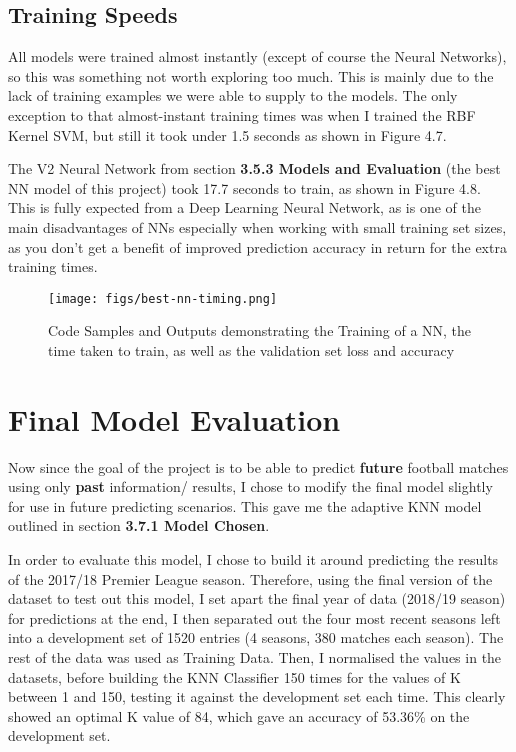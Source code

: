 \documentclass[12pt,a4paper,twoside,openright]{report}
\begin{document}
\subsection{Training Speeds}

All models were trained almost instantly (except of course the Neural Networks), so this was something not worth exploring too much. This is mainly due to the lack of training examples we were able to supply to the models. The only exception to that almost-instant training times was when I trained the RBF Kernel SVM, but still it took under 1.5 seconds as shown in Figure 4.7.

The V2 Neural Network from section \textbf{3.5.3 Models and Evaluation} (the best NN model of this project) took 17.7 seconds to train, as shown in Figure 4.8. This is fully expected from a Deep Learning Neural Network, as is one of the main disadvantages of NNs especially when working with small training set sizes, as you don't get a benefit of improved prediction accuracy in return for the extra training times.

\begin{figure}[h]
  \centering
  \texttt{[image: figs/best-nn-timing.png]}
  \caption{Code Samples and Outputs demonstrating the Training of a NN, the time taken to train, as well as the validation set loss and accuracy}
  \label{fig:best-nn-timing}
\end{figure}

\section{Final Model Evaluation}

Now since the goal of the project is to be able to predict \textbf{future} football matches using only \textbf{past} information/ results, I chose to modify the final model slightly for use in future predicting scenarios. This gave me the adaptive KNN model outlined in section \textbf{3.7.1 Model Chosen}.

In order to evaluate this model, I chose to build it around predicting the results of the 2017/18 Premier League season. Therefore, using the final version of the dataset to test out this model, I set apart the final year of data (2018/19 season) for predictions at the end, I then separated out the four most recent seasons left into a development set of 1520 entries (4 seasons, 380 matches each season). The rest of the data was used as Training Data. Then, I normalised the values in the datasets, before building the KNN Classifier 150 times for the values of K between 1 and 150, testing it against the development set each time. This clearly showed an optimal K value of 84, which gave an accuracy of 53.36\% on the development set.
\end{document}
